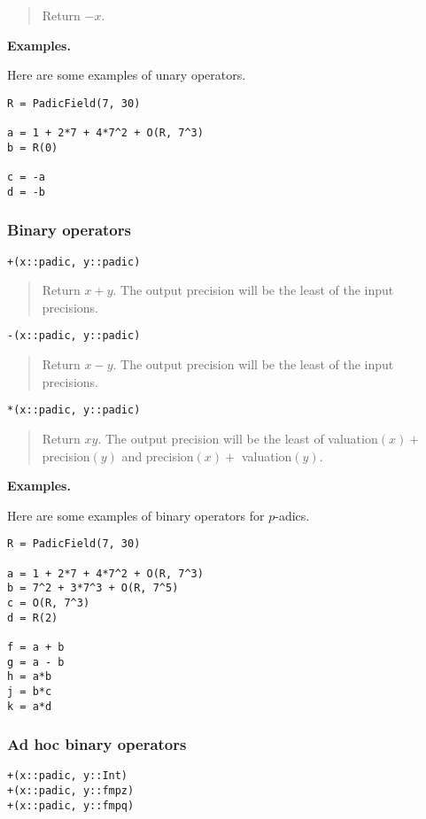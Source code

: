\documentclass[a4paper,10pt]{article}
\newcommand{\desc}[1]{\vspace{-3mm}\begin{quote}#1\end{quote}}
\begin{document}
{{\desc{Return $-x$.}

\textbf{Examples.}

Here are some examples of unary operators.

\begin{lstlisting}
R = PadicField(7, 30)

a = 1 + 2*7 + 4*7^2 + O(R, 7^3)
b = R(0)

c = -a
d = -b
\end{lstlisting}

\subsubsection{Binary operators}

\begin{lstlisting}
+(x::padic, y::padic)
\end{lstlisting}

\desc{Return $x + y$. The output precision will be the least of the input
precisions.}

\begin{lstlisting}
-(x::padic, y::padic)
\end{lstlisting}

\desc{Return $x - y$. The output precision will be the least of the input
precisions.}

\begin{lstlisting}
*(x::padic, y::padic)
\end{lstlisting}

\desc{Return $xy$. The output precision will be the least of valuation$(x) +$
precision$(y)$ and precision$(x) +$ valuation$(y)$.}

\textbf{Examples.}

Here are some examples of binary operators for $p$-adics.

\begin{lstlisting}
R = PadicField(7, 30)

a = 1 + 2*7 + 4*7^2 + O(R, 7^3)
b = 7^2 + 3*7^3 + O(R, 7^5)
c = O(R, 7^3)
d = R(2)

f = a + b
g = a - b
h = a*b
j = b*c
k = a*d
\end{lstlisting}

\subsubsection{Ad hoc binary operators}

\begin{lstlisting}
+(x::padic, y::Int)
+(x::padic, y::fmpz)
+(x::padic, y::fmpq)
\end{lstlisting}

}}
\end{document}
